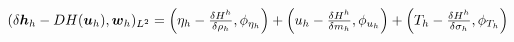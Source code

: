 \documentclass[preview]{standalone}
\newcommand{\bu}{\boldsymbol{u}_h}
\newcommand{\bw}{\boldsymbol{w}_h}
\newcommand{\dbh}{\delta\boldsymbol{h}_h}
\begin{document}
\begin{align*}
\special{dvisvgm:raw <g id='unique000'>}(\dbh-DH(\bu),\bw)_{L^2}=\Big(\eta_h-\tfrac{\delta H^h}{\delta\rho_h},\phi_{\eta_h}\Big)+\Big(u_h-\tfrac{\delta H^h}{\delta m_h},\phi_{u_h}\Big)+\Big(T_h-\tfrac{\delta H^h}{\delta\sigma_h},\phi_{T_h}\Big)\special{dvisvgm:raw </g>}
\end{align*}
\end{document}
